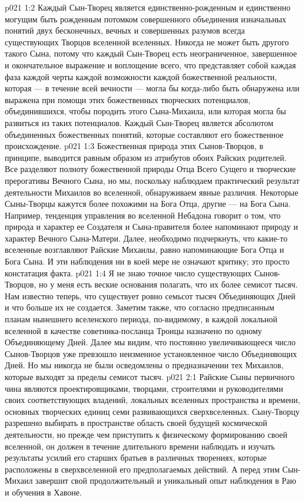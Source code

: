 \vs p021 1:2 Каждый Сын\hyp{}Творец является единственно\hyp{}рожденным и единственно могущим быть рожденным потомком совершенного объединения изначальных понятий двух бесконечных, вечных и совершенных разумов всегда существующих Творцов вселенной вселенных. Никогда не может быть другого такого Сына, потому что каждый Сын\hyp{}Творец есть неограниченное, завершенное и окончательное выражение и воплощение всего, что представляет собой каждая фаза каждой черты каждой возможности каждой божественной реальности, которая --- в течение всей вечности --- могла бы когда\hyp{}либо быть обнаружена или выражена при помощи этих божественных творческих потенциалов, объединившихся, чтобы породить этого Сына\hyp{}Михаила, или которая могла бы развиться из таких потенциалов. Каждый Сын\hyp{}Творец является абсолютом объединенных божественных понятий, которые составляют его божественное происхождение.
\vs p021 1:3 Божественная природа этих Сынов\hyp{}Творцов, в принципе, выводится равным образом из атрибутов обоих Райских родителей. Все разделяют полноту божественной природы Отца Всего Сущего и творческие прерогативы Вечного Сына, но мы, поскольку наблюдаем практический результат деятельности Михаилов во вселенной, обнаруживаем явные различия. Некоторые Сыны\hyp{}Творцы кажутся более похожими на Бога Отца, другие --- на Бога Сына. Например, тенденция управления во вселенной Небадона говорит о том, что природа и характер ее Создателя и Сына\hyp{}правителя более напоминают природу и характер Вечного Сына\hyp{}Матери. Далее, необходимо подчеркнуть, что какие\hyp{}то вселенные возглавляют Райские Михаилы, равно напоминающие Бога Отца и Бога Сына. И эти наблюдения ни в коей мере не означают критику; это просто констатация факта.
\vs p021 1:4 Я не знаю точное число существующих Сынов\hyp{}Творцов, но у меня есть веские основания полагать, что их более семисот тысяч. Нам известно теперь, что существует ровно семьсот тысяч Объединяющих Дней и что больше их не создается. Заметим также, что согласно предписанным планам нынешнего вселенского периода, по\hyp{}видимому, в каждой локальной вселенной в качестве советника\hyp{}посланца Троицы назначено по одному Объединяющему Дней. Далее мы видим, что постоянно увеличивающееся число Сынов\hyp{}Творцов уже превзошло неизменное установленное число Объединяющих Дней. Но мы никогда не были осведомлены о предназначении тех Михаилов, которые выходят за пределы семисот тысяч.
\vs p021 2:1 Райские Сыны первичного чина являются проектировщиками, творцами, строителями и руководителями своих соответствующих владений, локальных вселенных пространства и времени, основных творческих единиц семи развивающихся сверхвселенных. Сыну\hyp{}Творцу разрешено выбирать в пространстве область своей будущей космической деятельности, но прежде чем приступить к физическому формированию своей вселенной, он должен в течение длительного времени наблюдать и изучать результаты усилий его старших братьев в различных творениях, которые расположены в сверхвселенной его предполагаемых действий. А перед этим Сын\hyp{}Михаил завершит свой продолжительный и уникальный опыт наблюдения в Раю и обучения в Хавоне.
